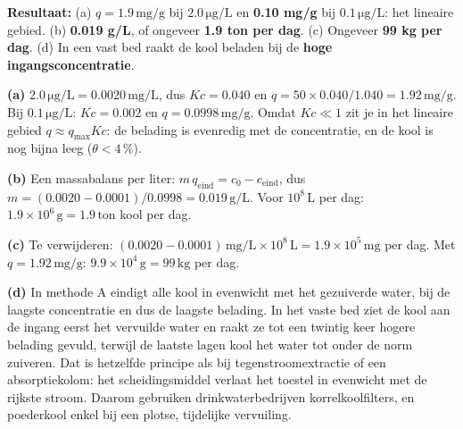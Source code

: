 \begin{oplossing}
\textbf{Resultaat:} (a) \(q = 1.9\,\mathrm{mg/g}\) bij \(2.0\,\mathrm{\mu g/L}\) en \textbf{0.10 mg/g} bij \(0.1\,\mathrm{\mu g/L}\): het lineaire gebied. (b) \textbf{0.019 g/L}, of ongeveer \textbf{1.9 ton per dag}. (c) Ongeveer \textbf{99 kg per dag}. (d) In een vast bed raakt de kool beladen bij de \textbf{hoge ingangsconcentratie}.

\textbf{(a)} \(2.0\,\mathrm{\mu g/L} = 0.0020\,\mathrm{mg/L}\), dus \(Kc = 0.040\) en \(q = 50 \times 0.040/1.040 = 1.92\,\mathrm{mg/g}\). Bij \(0.1\,\mathrm{\mu g/L}\): \(Kc = 0.002\) en \(q = 0.0998\,\mathrm{mg/g}\). Omdat \(Kc \ll 1\) zit je in het lineaire gebied \(q \approx q_{\max}Kc\): de belading is evenredig met de concentratie, en de kool is nog bijna leeg (\(\theta < 4\,\%\)).

\textbf{(b)} Een massabalans per liter: \(m\,q_{\text{eind}} = c_0 - c_{\text{eind}}\), dus \(m = (0.0020 - 0.0001)/0.0998 = 0.019\,\mathrm{g/L}\). Voor \(10^{8}\,\mathrm{L}\) per dag: \(1.9\times10^{6}\,\mathrm{g} = 1.9\,\mathrm{ton}\) kool per dag.

\textbf{(c)} Te verwijderen: \((0.0020 - 0.0001)\,\mathrm{mg/L} \times 10^{8}\,\mathrm{L} = 1.9\times10^{5}\,\mathrm{mg}\) per dag. Met \(q = 1.92\,\mathrm{mg/g}\): \(9.9\times10^{4}\,\mathrm{g} = 99\,\mathrm{kg}\) per dag.

\textbf{(d)} In methode A eindigt alle kool in evenwicht met het gezuiverde water, bij de laagste concentratie en dus de laagste belading. In het vaste bed ziet de kool aan de ingang eerst het vervuilde water en raakt ze tot een twintig keer hogere belading gevuld, terwijl de laatste lagen kool het water tot onder de norm zuiveren. Dat is hetzelfde principe als bij tegenstroomextractie of een absorptiekolom: het scheidingsmiddel verlaat het toestel in evenwicht met de rijkste stroom. Daarom gebruiken drinkwaterbedrijven korrelkoolfilters, en poederkool enkel bij een plotse, tijdelijke vervuiling.
\end{oplossing}

